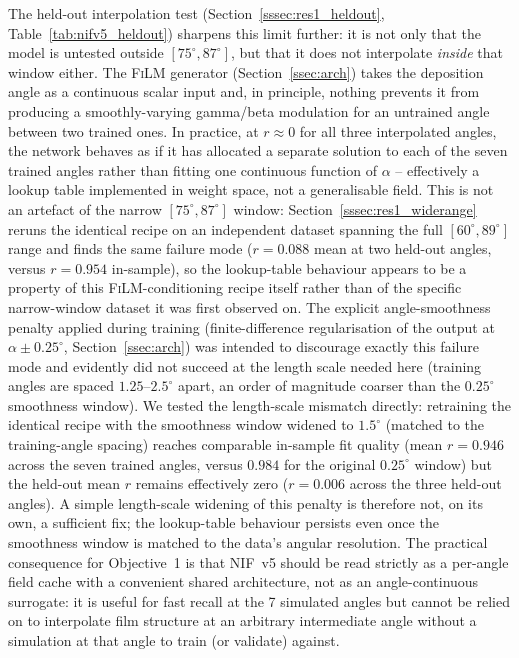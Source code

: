 \documentclass[aip,amsmath,amssymb,reprint]{revtex4-1}
\renewcommand{\ang}{\ensuremath{\alpha}} %
\newcommand{\nif}{\textsc{NIF}}
\newcommand{\film}{\textsc{FiLM}}
\begin{document}
The held-out interpolation test (Section~\ref{sssec:res1_heldout},
Table~\ref{tab:nifv5_heldout}) sharpens this limit further: it is not
only that the model is untested outside $[75^{\circ},87^{\circ}]$, but
that it does not interpolate \emph{inside} that window either. The
\film{} generator (Section~\ref{ssec:arch}) takes the deposition angle
as a continuous scalar input and, in principle, nothing prevents it
from producing a smoothly-varying gamma/beta modulation for an
untrained angle between two trained ones. In practice, at $r\approx0$
for all three interpolated angles, the network behaves as if it has
allocated a separate solution to each of the seven trained angles
rather than fitting one continuous function of $\ang$ -- effectively a
lookup table implemented in weight space, not a generalisable field.
This is not an artefact of the narrow $[75^{\circ},87^{\circ}]$ window:
Section~\ref{sssec:res1_widerange} reruns the identical recipe on an
independent dataset spanning the full $[60^{\circ},89^{\circ}]$ range
and finds the same failure mode ($r=0.088$ mean at two held-out
angles, versus $r=0.954$ in-sample), so the lookup-table behaviour
appears to be a property of this \film{}-conditioning recipe itself
rather than of the specific narrow-window dataset it was first
observed on.
The explicit angle-smoothness penalty applied during training
(finite-difference regularisation of the output at $\ang \pm 0.25^{\circ}$,
Section~\ref{ssec:arch}) was intended to discourage exactly this
failure mode and evidently did not succeed at the length scale
needed here (training angles are spaced $1.25$--$2.5^{\circ}$ apart,
an order of magnitude coarser than the $0.25^{\circ}$ smoothness
window). We tested the length-scale mismatch directly: retraining the
identical recipe with the smoothness window widened to $1.5^{\circ}$
(matched to the training-angle spacing) reaches comparable in-sample
fit quality (mean $r=0.946$ across the seven trained angles, versus
$0.984$ for the original $0.25^{\circ}$ window) but the held-out mean
$r$ remains effectively zero ($r=0.006$ across the three held-out
angles). A simple length-scale widening of this penalty is therefore
not, on its own, a sufficient fix; the lookup-table behaviour persists
even once the smoothness window is matched to the data's angular
resolution. The practical consequence for Objective~1 is that \nif{}~v5
should be read strictly as a per-angle field cache with a convenient
shared architecture, not as an angle-continuous surrogate: it is
useful for fast recall at the 7 simulated angles but cannot be relied
on to interpolate film structure at an arbitrary intermediate angle
without a simulation at that angle to train (or validate) against.
\end{document}
